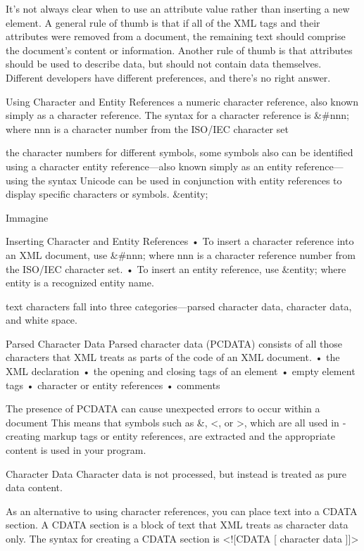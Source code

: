 It’s not always clear when to use an attribute value rather than inserting a new element.
A general rule of thumb is that if all of the XML tags and their attributes were
removed from a document, the remaining text should comprise the document’s content
or information.
Another rule of thumb is that attributes should be used to describe data, but should
not contain data themselves.
Different developers have different preferences, and
there’s no right answer.

Using Character and Entity References
a numeric character reference, also known simply as a ­character
reference. The syntax for a character reference is
\&\#nnn;
where nnn is a character number from the ISO/IEC character set

the character numbers for different symbols,
some symbols also can be identified using a character entity reference—also known
si­mply as an entity reference—using the syntax
Unicode can be used in
conjunction with entity
references to display
specific characters or
symbols.
\&entity;

Immagine


Inserting Character and Entity References
• To insert a character reference into an XML document, use
\&\#nnn;
where nnn is a character reference number from the ISO/IEC character set.
• To insert an entity reference, use
\&entity;
where entity is a recognized entity name.


text characters fall into three categories—parsed
character data, character data, and white space.


Parsed Character Data
Parsed character data (PCDATA) consists of all those characters that XML treats as parts
of the code of an XML document.
• the XML declaration
• the opening and closing tags of an element
• empty element tags
• character or entity references
• comments

The presence of PCDATA can cause unexpected errors to occur within a document
This means that symbols such as \&, <, or >, which are all used in ­creating
markup tags or entity references, are extracted and the appropriate content is used in your
program.

Character Data
Character data is not processed,
but instead is treated as pure data content.

As an alternative to using character references, you can place text into a CDATA section.
A CDATA section is a block of text that XML treats as character data only. The syntax for
creating a CDATA section is
<![CDATA [
		character data
	]]>

